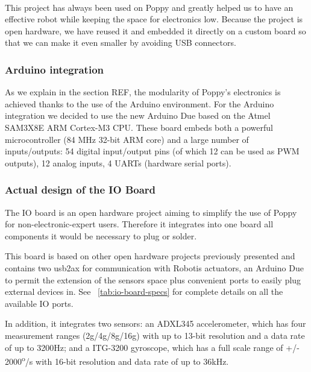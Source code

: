 \begin{figure}[tb]
\centering
    \hfil
    \\

    \caption{}
    \label{fig:usb2ax}
\end{figure}

This project has always been used on Poppy and greatly helped us to have an effective robot while keeping the space for electronics low.
Because the project is open hardware, we have reused it and embedded it directly on a custom board so that we can make it even smaller by avoiding USB connectors.

\subsubsection{Arduino integration} %
As we explain in the section REF, the modularity of Poppy’s electronics is achieved thanks to the use of the Arduino environment. For the Arduino integration we decided to use the new Arduino Due based on the Atmel SAM3X8E ARM Cortex-M3 CPU. These board embeds both a powerful microcontroller (84 MHz 32-bit ARM core) and a large number of inputs/outputs: 54 digital input/output pins (of which 12 can be used as PWM outputs), 12 analog inputs, 4 UARTs (hardware serial ports).


\subsubsection{Actual design of the IO Board} %
The IO board is an open hardware project aiming to simplify the use of Poppy for non-electronic-expert users. Therefore it integrates into one board all components it would be necessary to plug or solder.


This board is based on other open hardware projects previously presented and contains two usb2ax for communication with Robotis actuators, an Arduino Due to permit the extension of the sensors space plus convenient ports to easily plug external devices in. See \figurename~\ref{tab:io-board-specs} for complete details on all the available IO ports.

In addition, it integrates two sensors: an ADXL345 accelerometer, which has four measurement ranges (2g/4g/8g/16g) with up to 13-bit resolution and a data rate of up to 3200Hz; and a ITG-3200 gyroscope, which has a full scale range of +/- 2000\textsuperscript{o}/s with 16-bit resolution and data rate of up to 36kHz.



